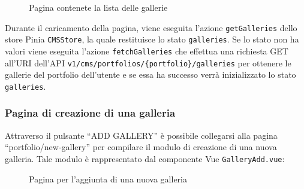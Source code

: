 \begin{figure}[htbp]
	\centering
	\fboxsep=0.5pt
	\fboxrule=0.5pt
	\caption{Pagina contenete la lista delle gallerie}
	\label{fig:cms-g-all}
\end{figure}

Durante il caricamento della pagina, viene eseguita l'azione \verb|getGalleries| dello store Pinia \verb|CMSStore|, la quale restituisce lo stato \verb|galleries|. Se lo stato non ha valori viene eseguita l'azione \verb|fetchGalleries| che effettua una richiesta GET all'URI dell'API \verb|v1/cms/portfolios/{portfolio}/galleries| per ottenere le gallerie del portfolio dell'utente e se essa ha successo verr\`a inizializzato lo stato \verb|galleries|. 

\subsubsection{Pagina di creazione di una galleria}
Attraverso il pulsante ``ADD GALLERY'' \`e possibile collegarsi alla pagina ``portfolio/new-gallery'' per compilare il modulo di creazione di una nuova galleria. Tale modulo \`e rappresentato dal componente Vue \verb|GalleryAdd.vue|:

\begin{figure}[htbp]
	\centering
	\fboxsep=0.5pt
	\fboxrule=0.5pt
	\caption{Pagina per l'aggiunta di una nuova galleria}
	\label{fig:cms-g-new}
\end{figure}

